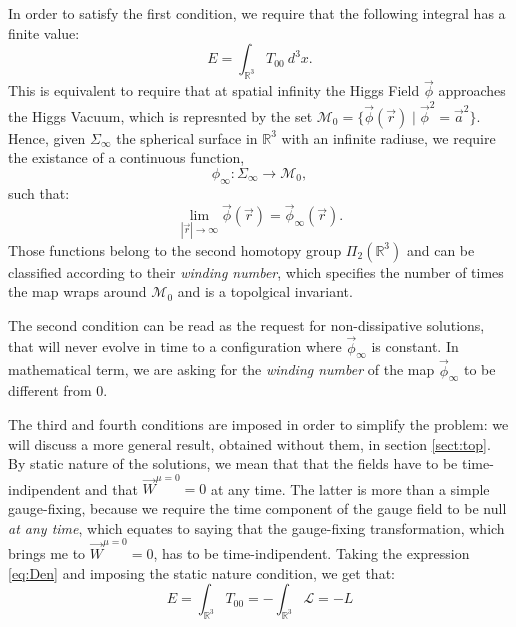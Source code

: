  In order to satisfy the first condition, we require that the following integral has a finite value: 
 \begin{equation}
 E = \int_{\mathbb{R}^3} T_{00} \ d^3x.
 \end{equation}
 This is equivalent to require that at spatial infinity the Higgs Field $\vec{\phi}$ approaches the Higgs Vacuum, which is represnted by the set $\mathcal{M}_0 = \{ \vec{\phi}(\vec{r})  \mid  \vec{\phi}^2 = \vec{a}^2 \}$. 
 Hence, given $\Sigma_{\infty}$ the spherical surface in $\mathbb{R}^3$ with an infinite radiuse, we require the existance of a continuous function, 
 \begin{equation}
     \phi_{\infty} \colon \Sigma_{\infty}  \to \mathcal{M}_0 ,
  \end{equation}
 such that:
 \begin{equation}
     \lim_{|\vec{r}|\to \infty} \vec{\phi}(\vec{r}) = \vec{\phi}_{\infty}(\vec{r}).
 \end{equation}
  Those functions belong to the second homotopy group $\Pi_2(\mathbb{R}^3)$ and can be classified according to their \textit{winding number}, which specifies the number of times the map wraps around $\mathcal{M}_0$ and is a topolgical invariant.
  \medskip
  
  The second condition can be read as the request for non-dissipative solutions, that will never evolve in time to a configuration where $\vec{\phi}_{\infty}$ is constant. In mathematical term, we are asking for the \textit{winding number} of the map $\vec{\phi}_{\infty}$ to be different from 0.
  \medskip
  
  The third and fourth conditions are imposed in order to simplify the problem: we will discuss a more general result, obtained without them, in section \ref{sect:top}.
  By static nature of the solutions, we mean that that the fields have to be time-indipendent and that $\vec{W}^{\mu = 0}= 0$ at any time. The latter is more than a simple gauge-fixing, because we require the time component of the gauge field to be null \textit{at any time}, which equates to saying that the gauge-fixing transformation, which brings me to $ \vec{W}^{\mu = 0}= 0$, has to be time-indipendent. Taking the expression \ref{eq:Den} and imposing the static nature condition, we get that: 
  \begin{equation}
      E = \int_{\mathbb{R}^3} T_{00} = - \int_{\mathbb{R}^3} \mathcal{L} = -L
      \label{eq:En}
  \end{equation}
 
